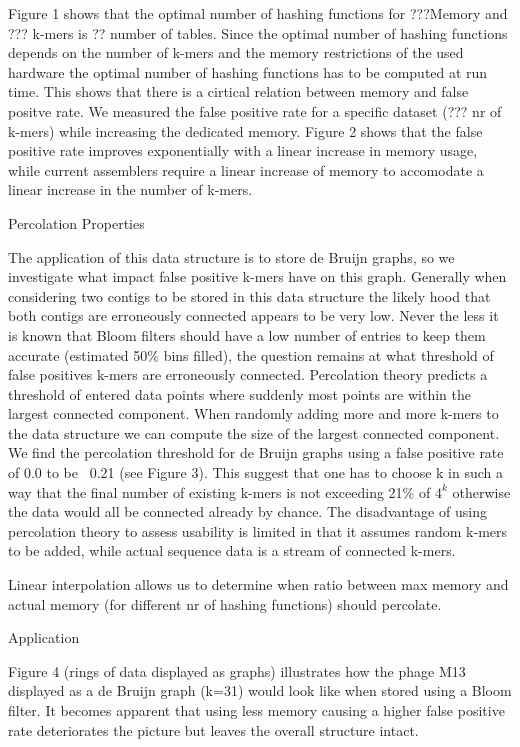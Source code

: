 \documentclass[12pt]{article} \usepackage{simplemargins}
\begin{document}
 Figure 1 shows that the optimal number of hashing functions for
 ???Memory and ??? k-mers is ?? number of tables. Since the optimal
 number of hashing functions depends on the number of k-mers and the
 memory restrictions of the used hardware the optimal number of
 hashing functions has to be computed at run time.  This shows that
 there is a cirtical relation between memory and false positve
 rate. We measured the false positive rate for a specific dataset (???
 nr of k-mers) while increasing the dedicated memory. Figure 2 shows
 that the false positive rate improves exponentially with a linear
 increase in memory usage, while current assemblers require a linear
 increase of memory to accomodate a linear increase in the number of
 k-mers.

Percolation Properties

The application of this data structure is to store de Bruijn graphs,
so we investigate what impact false positive k-mers have on this
graph. Generally when considering two contigs to be stored in this
data structure the likely hood that both contigs are erroneously
connected appears to be very low. Never the less it is known that
Bloom filters should have a low number of entries to keep them
accurate (estimated 50\% bins filled), the question remains at what
threshold of false positives k-mers are erroneously
connected. Percolation theory predicts a threshold of entered data
points where suddenly most points are within the largest connected
component. When randomly adding more and more k-mers to the data
structure we can compute the size of the largest connected
component. We find the percolation threshold for de Bruijn graphs
using a false positive rate of 0.0 to be ~0.21 (see Figure 3). This
suggest that one has to choose k in such a way that the final number
of existing k-mers is not exceeding 21\% of $4^k$ otherwise the data
would all be connected already by chance. The disadvantage of using
percolation theory to assess usability is limited in that it assumes
random k-mers to be added, while actual sequence data is a stream of
connected k-mers.

Linear interpolation allows us to determine when ratio between max memory and actual memory (for different nr of hashing functions) should percolate.

Application

Figure 4 (rings of data displayed as graphs) illustrates how the phage M13 displayed as a de Bruijn graph (k=31) would look like when stored using a Bloom filter. It becomes apparent that using less memory causing a higher false positive rate deteriorates the picture but leaves the overall structure intact.
\end{document}
